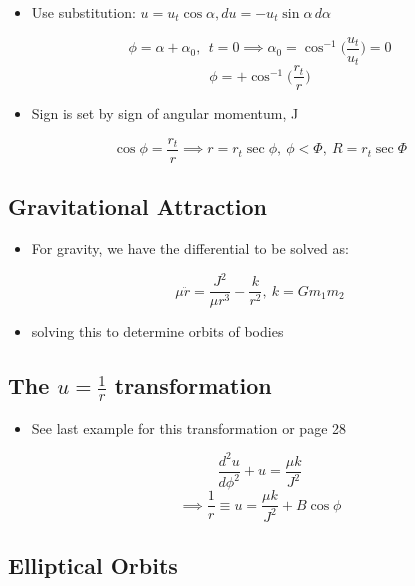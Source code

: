 \documentclass[a4paper,11pt,normalem]{article}
\begin{document}
\begin{example}
\begin{itemize}
\item
  Use substitution:
  \(u = u_t \cos\alpha, du = -u_t\sin\alpha \,d\alpha\)
\end{itemize}

\[
    \phi = \alpha + \alpha_0, ~~ t = 0 \implies \alpha_0 = \cos^{-1}\Big(\frac{u_t}{u_t}\Big) = 0 \]
\[
    \phi = +\cos^{-1}\Big(\frac{r_t}{r}\Big)
\]

\begin{itemize}
\item
  Sign is set by sign of angular momentum, J
\end{itemize}

\[
    \cos\phi = \frac{r_t}{r} \implies r = r_t\sec\phi,~ \phi < \Phi,~ R = r_t \sec\Phi
\]
\end{example}

\subsection{Gravitational Attraction}\label{gravitational-attraction}

\begin{itemize}
\item
  For gravity, we have the differential to be solved as:
\end{itemize}

\[
    \mu \ddot{r} = \frac{J^2}{\mu r^3} - \frac{k}{r^2},~ k = Gm_{1}m_{2}
\]

\begin{itemize}
\item
  solving this to determine orbits of bodies
\end{itemize}

\subsection{\texorpdfstring{The \(u = \frac{1}{r}\) transformation}{The u = \textbackslash{}frac\{1\}\{r\} transformation}}\label{the-u-frac1r-transformation}

\begin{itemize}
\item
  See last example for this transformation or page 28
\end{itemize}

\[
    \frac{d^2 u}{d\phi^2} + u = \frac{\mu k}{J^2} \] \[
    \implies \frac{1}{r} \equiv u = \frac{\mu k}{J^2} + B\cos\phi
\]

\subsection{Elliptical Orbits}\label{elliptical-orbits}
\end{document}
